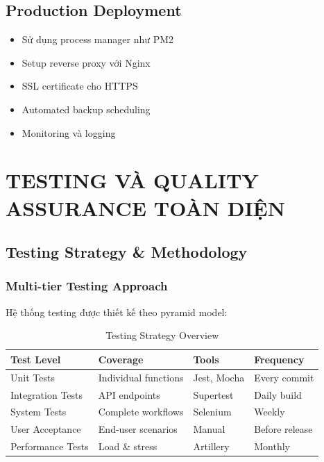 \documentclass[12pt,a4paper]{article}
\begin{document}
\subsection{Production Deployment}
\begin{itemize}
    \item Sử dụng process manager như PM2
    \item Setup reverse proxy với Nginx
    \item SSL certificate cho HTTPS
    \item Automated backup scheduling
    \item Monitoring và logging
\end{itemize}

\section{TESTING VÀ QUALITY ASSURANCE TOÀN DIỆN}

\subsection{Testing Strategy \& Methodology}
\subsubsection{Multi-tier Testing Approach}
Hệ thống testing được thiết kế theo pyramid model:

\begin{table}[H]
\centering
\begin{tabular}{@{}llll@{}}
\toprule
\textbf{Test Level} & \textbf{Coverage} & \textbf{Tools} & \textbf{Frequency} \\
\midrule
Unit Tests & Individual functions & Jest, Mocha & Every commit \\
Integration Tests & API endpoints & Supertest & Daily build \\
System Tests & Complete workflows & Selenium & Weekly \\
User Acceptance & End-user scenarios & Manual & Before release \\
Performance Tests & Load \& stress & Artillery & Monthly \\
\bottomrule
\end{tabular}
\caption{Testing Strategy Overview}
\end{table}
\end{document}

